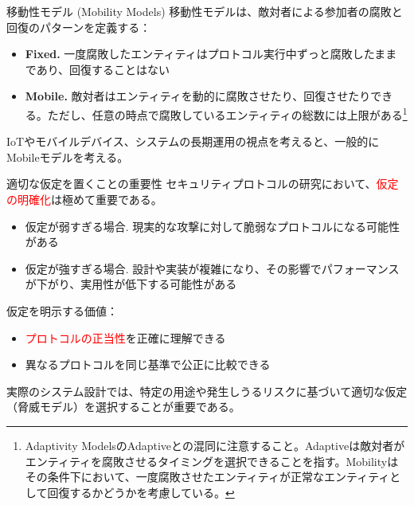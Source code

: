 \documentclass[aspectratio=169,10pt]{beamer}
\newenvironment{outlineblock}[1][]
{\begin{tcolorbox}[colframe=black, colback=white, boxrule=1pt, boxsep=5pt]}
{\end{tcolorbox}}
\begin{document}
\begin{frame}{移動性モデル (Mobility Models)}
移動性モデルは、敵対者による参加者の腐敗と回復のパターンを定義する：

\vspace{0.5em}

\begin{itemize}
    \item \textbf{Fixed. }一度腐敗したエンティティはプロトコル実行中ずっと腐敗したままであり、回復することはない
    
    \item \textbf{Mobile. }敵対者はエンティティを動的に腐敗させたり、回復させたりできる。ただし、任意の時点で腐敗しているエンティティの総数には上限がある\footnote{Adaptivity ModelsのAdaptiveとの混同に注意すること。Adaptiveは敵対者がエンティティを腐敗させるタイミングを選択できることを指す。Mobilityはその条件下において、一度腐敗させたエンティティが正常なエンティティとして回復するかどうかを考慮している。}
\end{itemize}

\vspace{0.5em}

\begin{outlineblock}[]
IoTやモバイルデバイス、システムの長期運用の視点を考えると、一般的にMobileモデルを考える。
\end{outlineblock}
\end{frame}

\begin{frame}{適切な仮定を置くことの重要性}
セキュリティプロトコルの研究において、\textcolor{red}{仮定の明確化}は極めて重要である。

\vspace{0.5em}

\begin{itemize}
    \item 仮定が弱すぎる場合. 現実的な攻撃に対して脆弱なプロトコルになる可能性がある
    \item 仮定が強すぎる場合. 設計や実装が複雑になり、その影響でパフォーマンスが下がり、実用性が低下する可能性がある
\end{itemize}

\vspace{0.5em}

仮定を明示する価値：
\begin{itemize}
    \item \textcolor{red}{プロトコルの正当性}を正確に理解できる
    \item 異なるプロトコルを同じ基準で公正に比較できる
\end{itemize}

\vspace{0.5em}

\begin{outlineblock}[]
実際のシステム設計では、特定の用途や発生しうるリスクに基づいて適切な仮定（脅威モデル）を選択することが重要である。
\end{outlineblock}
\end{frame}
\end{document}
